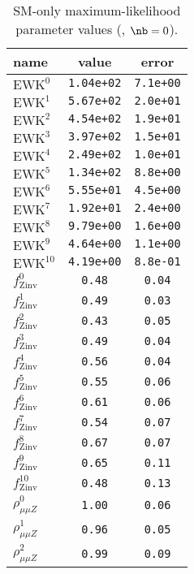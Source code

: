 \begin{table}\centering
\caption{SM-only maximum-likelihood parameter values (\njethigh, $\nb = 0$).}
\label{tab:mlParameterValues0b_ge4j}
\begin{tabular}{lcc}name & value & error \\ \hline
$\mathrm{EWK}^{0}$ & {\tt  1.04e+02} & {\tt  7.1e+00}\\
$\mathrm{EWK}^{1}$ & {\tt  5.67e+02} & {\tt  2.0e+01}\\
$\mathrm{EWK}^{2}$ & {\tt  4.54e+02} & {\tt  1.9e+01}\\
$\mathrm{EWK}^{3}$ & {\tt  3.97e+02} & {\tt  1.5e+01}\\
$\mathrm{EWK}^{4}$ & {\tt  2.49e+02} & {\tt  1.0e+01}\\
$\mathrm{EWK}^{5}$ & {\tt  1.34e+02} & {\tt  8.8e+00}\\
$\mathrm{EWK}^{6}$ & {\tt  5.55e+01} & {\tt  4.5e+00}\\
$\mathrm{EWK}^{7}$ & {\tt  1.92e+01} & {\tt  2.4e+00}\\
$\mathrm{EWK}^{8}$ & {\tt  9.79e+00} & {\tt  1.6e+00}\\
$\mathrm{EWK}^{9}$ & {\tt  4.64e+00} & {\tt  1.1e+00}\\
$\mathrm{EWK}^{10}$ & {\tt  4.19e+00} & {\tt  8.8e-01}\\
$f_\mathrm{Zinv}^{0}$ & {\tt 0.48} & {\tt 0.04}\\
$f_\mathrm{Zinv}^{1}$ & {\tt 0.49} & {\tt 0.03}\\
$f_\mathrm{Zinv}^{2}$ & {\tt 0.43} & {\tt 0.05}\\
$f_\mathrm{Zinv}^{3}$ & {\tt 0.49} & {\tt 0.04}\\
$f_\mathrm{Zinv}^{4}$ & {\tt 0.56} & {\tt 0.04}\\
$f_\mathrm{Zinv}^{5}$ & {\tt 0.55} & {\tt 0.06}\\
$f_\mathrm{Zinv}^{6}$ & {\tt 0.61} & {\tt 0.06}\\
$f_\mathrm{Zinv}^{7}$ & {\tt 0.54} & {\tt 0.07}\\
$f_\mathrm{Zinv}^{8}$ & {\tt 0.67} & {\tt 0.07}\\
$f_\mathrm{Zinv}^{9}$ & {\tt 0.65} & {\tt 0.11}\\
$f_\mathrm{Zinv}^{10}$ & {\tt 0.48} & {\tt 0.13}\\
$\rho_{\mu\mu Z}^{0}$ & {\tt 1.00} & {\tt 0.06}\\
$\rho_{\mu\mu Z}^{1}$ & {\tt 0.96} & {\tt 0.05}\\
$\rho_{\mu\mu Z}^{2}$ & {\tt 0.99} & {\tt 0.09}\\

\end{tabular}
\end{table}
